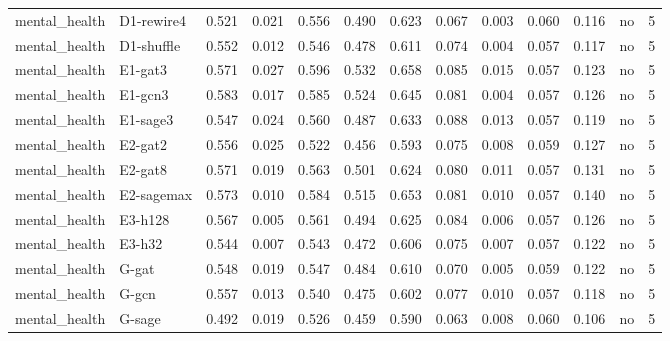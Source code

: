 \begin{table}[t]
\begin{tabular}{lllllllllllll}
mental\_health & D1-rewire4 & 0.521 & 0.021 & 0.556 & 0.490 & 0.623 & 0.067 & 0.003 & 0.060 & 0.116 & no & 5 \\
mental\_health & D1-shuffle & 0.552 & 0.012 & 0.546 & 0.478 & 0.611 & 0.074 & 0.004 & 0.057 & 0.117 & no & 5 \\
mental\_health & E1-gat3 & 0.571 & 0.027 & 0.596 & 0.532 & 0.658 & 0.085 & 0.015 & 0.057 & 0.123 & no & 5 \\
mental\_health & E1-gcn3 & 0.583 & 0.017 & 0.585 & 0.524 & 0.645 & 0.081 & 0.004 & 0.057 & 0.126 & no & 5 \\
mental\_health & E1-sage3 & 0.547 & 0.024 & 0.560 & 0.487 & 0.633 & 0.088 & 0.013 & 0.057 & 0.119 & no & 5 \\
mental\_health & E2-gat2 & 0.556 & 0.025 & 0.522 & 0.456 & 0.593 & 0.075 & 0.008 & 0.059 & 0.127 & no & 5 \\
mental\_health & E2-gat8 & 0.571 & 0.019 & 0.563 & 0.501 & 0.624 & 0.080 & 0.011 & 0.057 & 0.131 & no & 5 \\
mental\_health & E2-sagemax & 0.573 & 0.010 & 0.584 & 0.515 & 0.653 & 0.081 & 0.010 & 0.057 & 0.140 & no & 5 \\
mental\_health & E3-h128 & 0.567 & 0.005 & 0.561 & 0.494 & 0.625 & 0.084 & 0.006 & 0.057 & 0.126 & no & 5 \\
mental\_health & E3-h32 & 0.544 & 0.007 & 0.543 & 0.472 & 0.606 & 0.075 & 0.007 & 0.057 & 0.122 & no & 5 \\
mental\_health & G-gat & 0.548 & 0.019 & 0.547 & 0.484 & 0.610 & 0.070 & 0.005 & 0.059 & 0.122 & no & 5 \\
mental\_health & G-gcn & 0.557 & 0.013 & 0.540 & 0.475 & 0.602 & 0.077 & 0.010 & 0.057 & 0.118 & no & 5 \\
mental\_health & G-sage & 0.492 & 0.019 & 0.526 & 0.459 & 0.590 & 0.063 & 0.008 & 0.060 & 0.106 & no & 5 \\
\bottomrule
\end{tabular}
\end{table}
